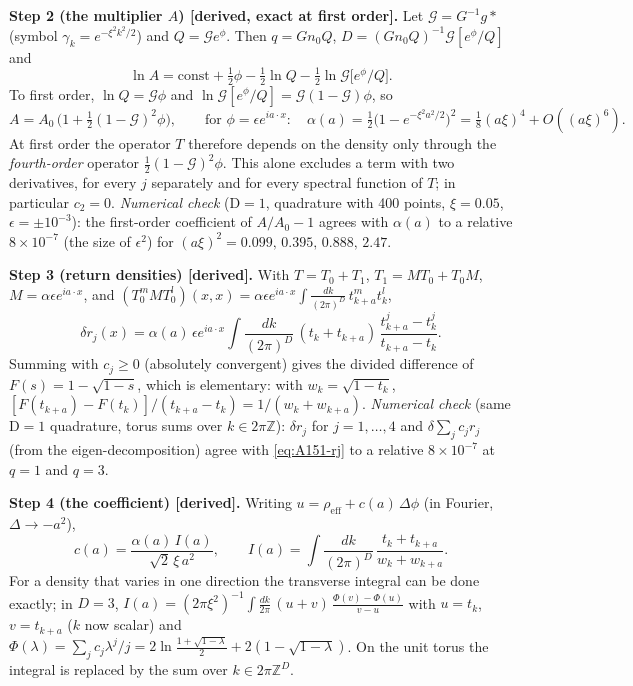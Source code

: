 \smallskip\noindent\textbf{Step 2 (the multiplier $A$) [derived, exact at first order].} Let $\mathcal G=G^{-1}g*$ (symbol
$\gamma_k=e^{-\xi^2k^2/2}$) and $Q=\mathcal G e^{\phi}$. Then $q=Gn_0Q$, $D=(Gn_0Q)^{-1}\mathcal G[e^\phi/Q]$ and
\begin{equation}\label{eq:A151-lnA}
\ln A=\mathrm{const}+\tfrac12\phi-\tfrac12\ln Q-\tfrac12\ln\mathcal G\big[e^{\phi}/Q\big].
\end{equation}
To first order, $\ln Q=\mathcal G\phi$ and $\ln\mathcal G[e^\phi/Q]=\mathcal G(1-\mathcal G)\phi$, so
\begin{equation}\label{eq:A151-alpha}
A=A_0\,\big(1+\tfrac12(1-\mathcal G)^2\phi\big),\qquad\text{for }\phi=\epsilon e^{ia\cdot x}:\quad
\alpha(a)=\tfrac12\big(1-e^{-\xi^2a^2/2}\big)^2=\tfrac18(a\xi)^4+O((a\xi)^6).
\end{equation}
At first order the operator $T$ therefore depends on the density only through the \emph{fourth-order} operator
$\tfrac12(1-\mathcal G)^2\phi$. This alone excludes a term with two derivatives, for every $j$ separately and for
every spectral function of $T$; in particular $c_2=0$.
\emph{Numerical check} (D$=1$, quadrature with 400 points, $\xi=0.05$, $\epsilon=\pm10^{-3}$): the first-order
coefficient of $A/A_0-1$ agrees with $\alpha(a)$ to a relative $8\times10^{-7}$ (the size of $\epsilon^2$) for
$(a\xi)^2=0.099,\,0.395,\,0.888,\,2.47$.

\smallskip\noindent\textbf{Step 3 (return densities) [derived].} With $T=T_0+T_1$, $T_1=MT_0+T_0M$, $M=\alpha\epsilon
e^{ia\cdot x}$, and $(T_0^mMT_0^{l})(x,x)=\alpha\epsilon e^{ia\cdot x}\int\!\frac{dk}{(2\pi)^D}\,t_{k+a}^m t_k^l$,
\begin{equation}\label{eq:A151-rj}
\delta r_j(x)=\alpha(a)\,\epsilon e^{ia\cdot x}\int\!\frac{dk}{(2\pi)^D}\,
(t_k+t_{k+a})\,\frac{t_{k+a}^j-t_k^j}{t_{k+a}-t_k}.
\end{equation}
Summing with $c_j\ge0$ (absolutely convergent) gives the divided difference of $F(s)=1-\sqrt{1-s}$, which is
elementary: with $w_k=\sqrt{1-t_k}$, $[F(t_{k+a})-F(t_k)]/(t_{k+a}-t_k)=1/(w_k+w_{k+a})$.
\emph{Numerical check} (same D$=1$ quadrature, torus sums over $k\in2\pi\mathbb Z$): $\delta r_j$ for $j=1,\dots,4$ and
$\delta\sum_jc_jr_j$ (from the eigen-decomposition) agree with \eqref{eq:A151-rj} to a relative $8\times10^{-7}$ at
$q=1$ and $q=3$.

\smallskip\noindent\textbf{Step 4 (the coefficient) [derived].} Writing $u=\rho_{\mathrm{eff}}+c(a)\,\Delta\phi$ (in
Fourier, $\Delta\to-a^2$),
\begin{equation}\label{eq:A151-c}
c(a)=\frac{\alpha(a)\,I(a)}{\sqrt2\,\xi\,a^2},\qquad
I(a)=\int\!\frac{dk}{(2\pi)^D}\,\frac{t_k+t_{k+a}}{w_k+w_{k+a}}.
\end{equation}
For a density that varies in one direction the transverse integral can be done exactly; in $D=3$,
$I(a)=(2\pi\xi^2)^{-1}\int\frac{dk}{2\pi}\,(u+v)\,\frac{\Phi(v)-\Phi(u)}{v-u}$ with $u=t_k$, $v=t_{k+a}$ ($k$ now scalar)
and $\Phi(\lambda)=\sum_jc_j\lambda^j/j=2\ln\frac{1+\sqrt{1-\lambda}}2+2(1-\sqrt{1-\lambda})$. On the unit torus the
integral is replaced by the sum over $k\in2\pi\mathbb Z^D$.

